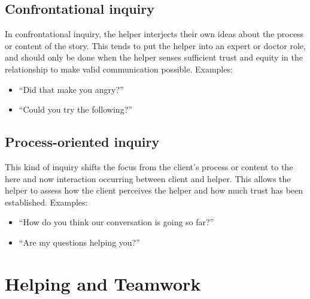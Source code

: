 \documentclass{article}
\newenvironment{nosepitemize}
{ \begin{itemize}
    \setlength{\itemsep}{0pt}
    \setlength{\parskip}{0pt}
    \setlength{\parsep}{0pt}     }
{ \end{itemize}                  }
\begin{document}
\begin{multicols}{2}
\subsection{Confrontational inquiry}

In confrontational inquiry, the helper interjects their own ideas about the process or content of the story. This tends to put the helper into an expert or doctor role, and should only be done when the helper senses sufficient trust and equity in the relationship to make valid communication possible. Examples:
\begin{nosepitemize}
    \item ``Did that make you angry?''
    \item ``Could you try the following?''
\end{nosepitemize}

\subsection{Process-oriented inquiry}

This kind of inquiry shifts the focus from the client's process or content to the here and now interaction occurring between client and helper. This allows the helper to assess how the client perceives the helper and how much trust has been established. Examples:
\begin{nosepitemize}
    \item ``How do you think our conversation is going so far?''
    \item ``Are my questions helping you?''
\end{nosepitemize}

\end{multicols}

\section{Helping and Teamwork}
\end{document}
